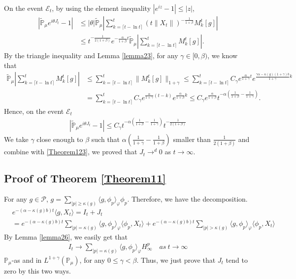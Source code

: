 \documentclass[12pt, a4paper]{amsart}
\theoremstyle{definition}
\numberwithin{equation}{section}
\begin{document}
On the event $\mathcal{E}_t$, by using the element inequality $|e^{i z}-1|\leq |z|$,
\begin{align*}
    \left|\mathbb{\tilde{P}}_{\mu}e^{i\theta J_t}-1\right|&\leq|\theta| \mathbb{\tilde{P}}_{\mu}\left|\sum_{k=\lceil t-\ln t \rceil}^t \left(t\|X_t\|\right)^{-\frac{1}{1+\beta}}M_k^t[g]\right|\\
    &\leq t^{-\frac{1}{2(1+\beta)}}e^{-\frac{\alpha}{1+\beta}t}\mathbb{\tilde{P}}_{\mu}\left|\sum_{k=\lceil t-\ln t \rceil}^t M_k^t[g]\right|.
\end{align*}
By the triangle inequality and Lemma \ref{lemma23}, for any $\gamma\in[0,\beta)$, we know that
\begin{align*}
    \mathbb{\tilde{P}}_{\mu}\left|\sum_{k=\lceil t-\ln t \rceil}^t M_k^t[g]\right|&\leq \sum_{k=\lceil t-\ln t \rceil}^t \|M_k^t[g]\|_{1+\gamma}\leq\sum_{k=\lceil t-\ln t \rceil}^t C_{\gamma}e^{\frac{\alpha}{1+\gamma}t}e^{\frac{\gamma \alpha-\kappa(g)(1+\gamma)b}{1+\gamma}k}\\
    &=\sum_{k=\lceil t-\ln t \rceil}^t C_{\gamma}e^{\frac{\alpha}{1+\gamma}(t-k)}e^{\frac{\alpha}{1+\beta}k}\leq C_{\gamma}e^{\frac{\alpha}{1+\beta}}t^{-\alpha(\frac{1}{1+\beta}-\frac{1}{1+\gamma})}.
\end{align*}
Hence, on the event $\mathcal{E}_t$
\begin{align*}
    \left|\mathbb{\tilde{P}}_{\mu}e^{i\theta J_t}-1\right|\leq C_{\gamma}t^{-\alpha(\frac{1}{1+\beta}-\frac{1}{1+\gamma})} t^{-\frac{1}{2(1+\beta)}}
\end{align*}
We take $\gamma$ close enough to $\beta$ such that $\alpha(\frac{1}{1+\gamma}-\frac{1}{1+\beta})$ smaller than $\frac{1}{2(1+\beta)}$ and combine with \eqref{Theorem123}, we proved that $J_t \rightarrow^d 0$ as $t\rightarrow \infty$.

\subsection{Proof of Theorem \ref{Theorem11}}
For any $g\in \mathcal{P}$, $g=\sum_{|p|\geq \kappa(g)}\langle g,\phi_p\rangle_\varphi \phi_p$. Therefore, we have the decomposition.
\begin{align*}
    &e^{-(\alpha-\kappa(g)b)t}\langle g,X_t\rangle=I_t+J_t\\
    &=e^{-(\alpha-\kappa(g)b)t}\sum_{|p|= \kappa(g)}\langle g,\phi_p\rangle_\varphi \langle \phi_p,X_t\rangle+e^{-(\alpha-\kappa(g)b)t}\sum_{|p|> \kappa(g)}\langle g,\phi_p\rangle_\varphi \langle \phi_p,X_t\rangle
\end{align*}
By Lemma \ref{lemma26}, we easily get that 
\begin{align*}
    I_t \rightarrow \sum_{|p|=\kappa(g)}\langle g, \phi_p\rangle_{\varphi} H_{\infty}^p  \quad as~ t\rightarrow \infty
\end{align*}
$\mathbb{P}_{\mu}$-as and in $L^{1+\gamma}(\mathbb{P}_{\mu})$, for any $0\leq \gamma<\beta$. Thus, we just prove that $J_t$ tend to zero by this two ways.
\end{document}
